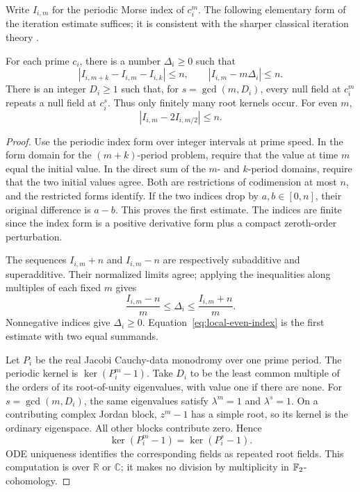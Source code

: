 Write \(I_{i,m}\) for the periodic Morse index of \(c_i^m\).
The following elementary form of the iteration estimate suffices;
it is consistent with the sharper classical iteration theory
\cite{Bott1956Iteration}.

\begin{lemma}\label{lem:local-iteration}
For each prime \(c_i\), there is a number \(\Delta_i\ge0\) such that
\begin{equation}\label{eq:local-index}
 |I_{i,m+k}-I_{i,m}-I_{i,k}|\le n,\qquad
 |I_{i,m}-m\Delta_i|\le n.
\end{equation}
There is an integer \(D_i\ge1\) such that, for
\(s=\gcd(m,D_i)\), every null field at \(c_i^m\) repeats a null field
at \(c_i^s\).  Thus only finitely many root kernels occur.
For even \(m\),
\begin{equation}\label{eq:local-even-index}
 |I_{i,m}-2I_{i,m/2}|\le n.
\end{equation}
\end{lemma}

\begin{proof}
Use the periodic index form over integer intervals at prime speed.
In the form domain for the \((m+k)\)-period problem, require that the
value at time \(m\) equal the initial value.  In the direct sum of
the \(m\)- and \(k\)-period domains, require that the two initial
values agree.  Both are restrictions of codimension at most \(n\),
and the restricted forms identify.  If the two indices drop by
\(a,b\in[0,n]\), their original difference is \(a-b\).  This proves
the first estimate.  The indices are finite since the index form
is a positive derivative form plus a compact zeroth-order
perturbation.

The sequences \(I_{i,m}+n\) and \(I_{i,m}-n\) are respectively
subadditive and superadditive.  Their normalized limits agree;
applying the inequalities along multiples of each fixed \(m\)
gives
\[
 \frac{I_{i,m}-n}{m}\le\Delta_i
                         \le\frac{I_{i,m}+n}{m}.
\]
Nonnegative indices give \(\Delta_i\ge0\).
Equation~\eqref{eq:local-even-index} is the first estimate with two
equal summands.

Let \(P_i\) be the real Jacobi Cauchy-data monodromy over one prime
period.  The periodic kernel is \(\ker(P_i^m-1)\).  Take \(D_i\) to
be the least common multiple of the orders of its root-of-unity
eigenvalues, with value one if there are none.  For
\(s=\gcd(m,D_i)\), the same eigenvalues satisfy \(\lambda^m=1\)
and \(\lambda^s=1\).  On a contributing complex Jordan block,
\(z^m-1\) has a simple root, so its kernel is the ordinary
eigenspace.  All other blocks contribute zero.  Hence
\[
 \ker(P_i^m-1)=\ker(P_i^s-1).
\]
ODE uniqueness identifies the corresponding fields as repeated
root fields.  This computation is over \(\mathbb R\) or
\(\mathbb C\); it makes no division by multiplicity in
\(\mathbb F_2\)-cohomology.
\end{proof}

